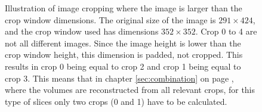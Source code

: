 \begin{figure}
\begin{minipage}{0.99\textwidth}
    \end{minipage}
    \caption{
        Illustration of image cropping where the image is larger than the crop window dimensions.
        The original size of the image is $291 \times 424$, and the crop window used has dimensions $352 \times 352$.
        Crop 0 to 4 are not all different images. Since the image height is lower than the crop window height, this dimension is padded, not cropped.
        This results in crop 0 being equal to crop 2 and crop 1 being equal to crop 3. This means that in chapter \ref{sec:combination} on page \pageref{sec:combination}, 
        where the volumes are reconstructed from all relevant crops, for this type of slices only two crops (0 and 1) have to be calculated.
        \label{fig:smallcrop}
        }
    
\end{figure}
